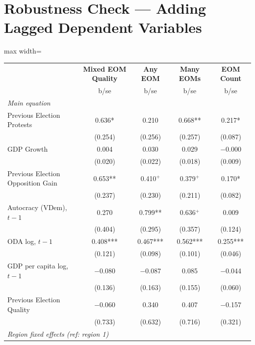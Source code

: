 \documentclass[USletter,12pt, titlepage]{article} %
\begin{document}
\newpage

\section{Robustness Check --- Adding Lagged Dependent Variables}
\begin{table}[H]
\centering
\begin{adjustbox}{max width=\textwidth}
\begin{threeparttable}
\begin{tabular}{lcccc}
\toprule
 & \textbf{Mixed EOM Quality} & \textbf{Any EOM} & \textbf{Many EOMs} & \textbf{EOM Count} \\
 & b/se & b/se & b/se & b/se \\
\midrule
\multicolumn{5}{l}{\textit{Main equation}} \\
\midrule

Previous Election Protests & 0.636* & 0.210 & 0.668** & 0.217* \\
 & (0.254) & (0.256) & (0.257) & (0.087) \\
GDP Growth & 0.004 & 0.030 & 0.029 & $-$0.000 \\
 & (0.020) & (0.022) & (0.018) & (0.009) \\
Previous Election Opposition Gain & 0.653** & 0.410$^{+}$ & 0.379$^{+}$ & 0.170* \\
 & (0.237) & (0.230) & (0.211) & (0.082) \\
Autocracy (VDem), $t-1$ & 0.270 & 0.799** & 0.636$^{+}$ & 0.009 \\
 & (0.404) & (0.295) & (0.357) & (0.124) \\
ODA log, $t-1$ & 0.408*** & 0.467*** & 0.562*** & 0.255*** \\
 & (0.121) & (0.098) & (0.101) & (0.046) \\
GDP per capita log, $t-1$ & $-$0.080 & $-$0.087 & 0.085 & $-$0.044 \\
 & (0.136) & (0.163) & (0.155) & (0.060) \\
Previous Election Quality & $-$0.060 & 0.340 & 0.407 & $-$0.157 \\
 & (0.733) & (0.632) & (0.716) & (0.321) \\
\midrule
\multicolumn{5}{l}{\textit{Region fixed effects (ref: region 1)}} \\


\end{tabular}
\end{threeparttable}
\end{adjustbox}
\end{table}
\end{document}
